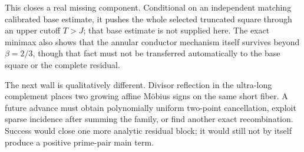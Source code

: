 This closes a real missing component.  Conditional on an independent
matching calibrated base estimate, it pushes the whole selected
truncated square through an upper cutoff \(T>J\); that base estimate is
not supplied here.  The exact minimax also shows that the annular
conductor mechanism itself survives beyond \(\beta=2/3\), though that
fact must not be transferred automatically to the base square or the
complete residual.

The next wall is qualitatively different.  Divisor reflection in the
ultra-long complement places two growing affine M\"obius signs on the
same short fiber.  A future advance must obtain polynomially uniform
two-point cancellation, exploit sparse incidence after summing the
family, or find another exact recombination.  Success would close one
more analytic residual block; it would still not by itself produce a
positive prime-pair main term.
